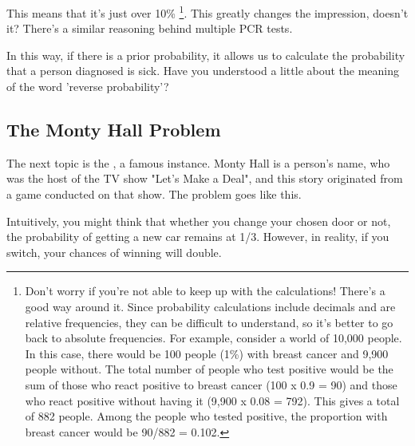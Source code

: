 \documentclass{ltjsbook}
\begin{document}
This means that it's just over 10\% \footnote{Don’t worry if you're not able to keep up with the calculations! There's a good way around it. Since probability calculations include decimals and are relative frequencies, they can be difficult to understand, so it's better to go back to absolute frequencies. For example, consider a world of 10,000 people. In this case, there would be 100 people (1\%) with breast cancer and 9,900 people without. The total number of people who test positive would be the sum of those who react positive to breast cancer (100 x 0.9 = 90) and those who react positive without having it (9,900 x 0.08 = 792). This gives a total of 882 people. Among the people who tested positive, the proportion with breast cancer would be 90/882 = 0.102.}. This greatly changes the impression, doesn't it? There's a similar reasoning behind multiple PCR tests.

In this way, if there is a prior probability, it allows us to calculate the probability that a person diagnosed is sick. Have you understood a little about the meaning of the word 'reverse probability'?

\subsection{The Monty Hall Problem}

The next topic is the , a famous instance. Monty Hall is a person's name, who was the host of the TV show "Let's Make a Deal", and this story originated from a game conducted on that show. The problem goes like this.



Intuitively, you might think that whether you change your chosen door or not, the probability of getting a new car remains at 1/3. However, in reality, if you switch, your chances of winning will double.
\end{document}
